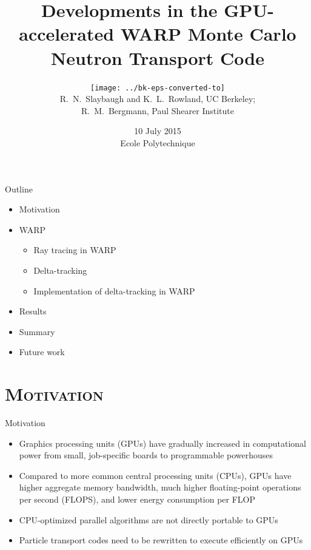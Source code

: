 \documentclass[xcolor=x11names,compress, handout]{beamer}
\renewcommand{\(}{\begin{columns}}
\renewcommand{\)}{\end{columns}}
\newcommand{\<}[1]{\begin{column}{#1}}
\renewcommand{\>}{\end{column}}
\begin{document}
\begin{frame}
\title[Developments in WARP]{Developments in the GPU-accelerated WARP Monte Carlo Neutron Transport Code}
\author{\texttt{[image: ../bk-eps-converted-to]}\\R.\ N.\ Slaybaugh and K.\ L.\ Rowland, UC Berkeley; \\R.\ M.\ Bergmann, Paul Shearer Institute}
\date{10 July 2015 \\ Ecole Polytechnique}
\titlepage
\end{frame}

\begin{frame}[fragile]{Outline}
	\begin{itemize}
	\item{Motivation}
	\item{WARP}
	\begin{itemize}
	    \item{Ray tracing in WARP}
	    \item{Delta-tracking}
	    \item{Implementation of delta-tracking in WARP}
	\end{itemize}
	\item{Results}
	\item{Summary}
	\item{Future work}
	\end{itemize}
\end{frame}


\section{\scshape Motivation}
\begin{frame}{Motivation}
	\begin{itemize}
	\pause
	\item{Graphics processing units (GPUs) have gradually increased in computational power from small,
	job-specific boards to programmable powerhouses}
	\pause
	\item{Compared to more common central processing units (CPUs), GPUs have higher aggregate memory
	bandwidth, much higher floating-point operations per second (FLOPS), and lower energy consumption
	per FLOP \cite{warp}}
	\pause
	\item{CPU-optimized parallel algorithms are not directly portable to GPUs}
	\pause
	\item{Particle transport codes need to be rewritten to execute efficiently on GPUs 
	\cite{warp}}
	\end{itemize}
\end{frame}
\end{document}
